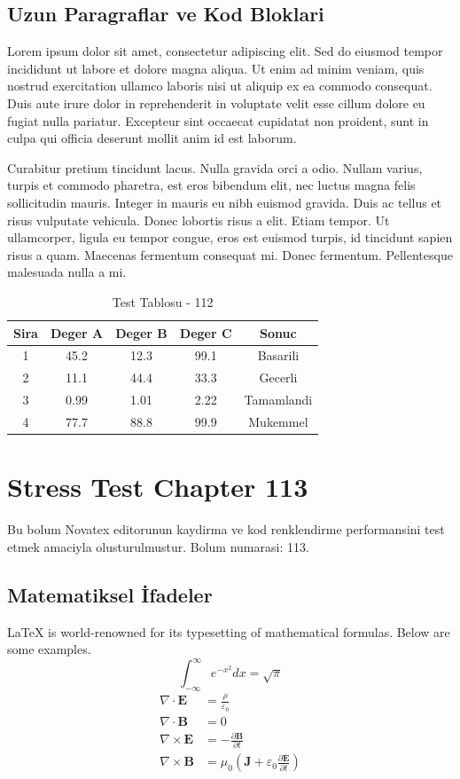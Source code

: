\documentclass[12pt,a4paper]{article}
\begin{document}
\subsection{Uzun Paragraflar ve Kod Bloklari}
Lorem ipsum dolor sit amet, consectetur adipiscing elit. Sed do eiusmod tempor incididunt ut labore et dolore magna aliqua. Ut enim ad minim veniam, quis nostrud exercitation ullamco laboris nisi ut aliquip ex ea commodo consequat. Duis aute irure dolor in reprehenderit in voluptate velit esse cillum dolore eu fugiat nulla pariatur. Excepteur sint occaecat cupidatat non proident, sunt in culpa qui officia deserunt mollit anim id est laborum.

Curabitur pretium tincidunt lacus. Nulla gravida orci a odio. Nullam varius, turpis et commodo pharetra, est eros bibendum elit, nec luctus magna felis sollicitudin mauris. Integer in mauris eu nibh euismod gravida. Duis ac tellus et risus vulputate vehicula. Donec lobortis risus a elit. Etiam tempor. Ut ullamcorper, ligula eu tempor congue, eros est euismod turpis, id tincidunt sapien risus a quam. Maecenas fermentum consequat mi. Donec fermentum. Pellentesque malesuada nulla a mi.

\begin{table}[h!]
\centering
\begin{tabular}{|c|c|c|c|c|}
\hline
\textbf{Sira} & \textbf{Deger A} & \textbf{Deger B} & \textbf{Deger C} & \textbf{Sonuc} \\
\hline
1 & 45.2 & 12.3 & 99.1 & Basarili \\
2 & 11.1 & 44.4 & 33.3 & Gecerli \\
3 & 0.99 & 1.01 & 2.22 & Tamamlandi \\
4 & 77.7 & 88.8 & 99.9 & Mukemmel \\
\hline
\end{tabular}
\caption{Test Tablosu - 112}
\end{table}

\newpage
\section{Stress Test Chapter 113}
Bu bolum Novatex editorunun kaydirma ve kod renklendirme performansini test etmek amaciyla olusturulmustur. Bolum numarasi: 113.

\subsection{Matematiksel İfadeler}
\LaTeX{} is world-renowned for its typesetting of mathematical formulas. Below are some examples.
\begin{equation}
\int_{-\infty}^{\infty} e^{-x^2} dx = \sqrt{\pi}
\end{equation}
\begin{align}
\nabla \cdot \mathbf{E} &= \frac{\rho}{\varepsilon_0} \\
\nabla \cdot \mathbf{B} &= 0 \\
\nabla \times \mathbf{E} &= -\frac{\partial \mathbf{B}}{\partial t} \\
\nabla \times \mathbf{B} &= \mu_0\left(\mathbf{J} + \varepsilon_0 \frac{\partial \mathbf{E}}{\partial t}\right)
\end{align}
\end{document}
